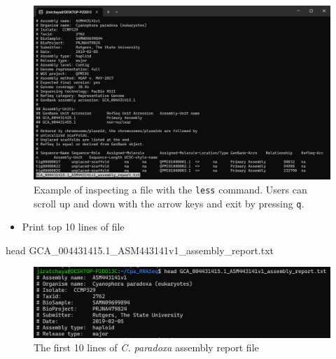 \documentclass[
  letterpaper,
  DIV=11,
  numbers=noendperiod]{scrreprt}
\newenvironment{Shaded}{\begin{snugshade}}{\end{snugshade}}
\newcommand{\FunctionTok}[1]{\textcolor[rgb]{0.28,0.35,0.67}{#1}}
\newcommand{\NormalTok}[1]{\textcolor[rgb]{0.00,0.23,0.31}{#1}}
\providecommand{\tightlist}{%
  \setlength{\itemsep}{0pt}\setlength{\parskip}{0pt}}\usepackage{longtable,booktabs,array}
\begin{document}
\begin{figure}

{\centering \includegraphics[width=1\textwidth,height=\textheight]{./assets/06_less_file.png}

}

\caption{Example of inspecting a file with the \texttt{less} command.
Users can scroll up and down with the arrow keys and exit by pressing
\texttt{q}.}

\end{figure}

\begin{itemize}
\tightlist
\item
  Print top 10 lines of file
\end{itemize}

\begin{Shaded}
\begin{Highlighting}[]
\FunctionTok{head}\NormalTok{ GCA\_004431415.1\_ASM443141v1\_assembly\_report.txt}
\end{Highlighting}
\end{Shaded}

\begin{figure}

{\centering \includegraphics{./assets/07_head_file.png}

}

\caption{The first 10 lines of \emph{C. paradoxa} assembly report file}

\end{figure}
\end{document}
